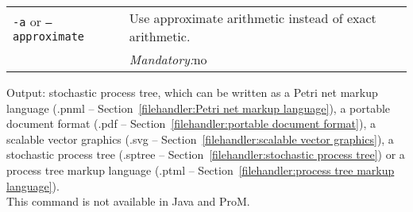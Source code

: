 {\begin{tabularx}{\linewidth}{lX}
\texttt{-a} or \texttt{--approximate} & Use approximate arithmetic instead of exact arithmetic.\\
&\textit{Mandatory:}\quad no\\
\bottomrule
\end{tabularx}
\noindent Output: stochastic process tree, which can be written as a Petri net markup language (.pnml -- Section~\ref{filehandler:Petri net markup language}), a portable document format (.pdf -- Section~\ref{filehandler:portable document format}), a scalable vector graphics (.svg -- Section~\ref{filehandler:scalable vector graphics}), a stochastic process tree (.sptree -- Section~\ref{filehandler:stochastic process tree}) or a process tree markup language (.ptml -- Section~\ref{filehandler:process tree markup language}).
\\This command is not available in Java and ProM.
}
